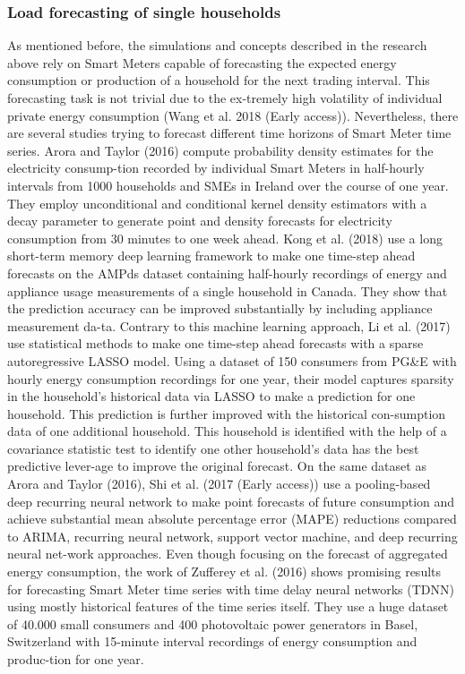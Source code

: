 \subsubsection{Load forecasting of single households}
As mentioned before, the simulations and concepts described in the research above rely on Smart Meters capable of forecasting the expected energy consumption or production of a household for the next trading interval. This forecasting task is not trivial due to the ex-tremely high volatility of individual private energy consumption (Wang et al. 2018 (Early access)). Nevertheless, there are several studies trying to forecast different time horizons of Smart Meter time series.
Arora and Taylor (2016) compute probability density estimates for the electricity consump-tion recorded by individual Smart Meters in half-hourly intervals from 1000 households and SMEs in Ireland over the course of one year. They employ unconditional and conditional kernel density estimators with a decay parameter to generate point and density forecasts for electricity consumption from 30 minutes to one week ahead.
Kong et al. (2018) use a long short-term memory deep learning framework to make one time-step ahead forecasts on the AMPds dataset containing half-hourly recordings of energy and appliance usage measurements of a single household in Canada. They show that the prediction accuracy can be improved substantially by including appliance measurement da-ta.
Contrary to this machine learning approach, Li et al. (2017) use statistical methods to make one time-step ahead forecasts with a sparse autoregressive LASSO model. Using a dataset of 150 consumers from PG\&E with hourly energy consumption recordings for one year, their model captures sparsity in the household’s historical data via LASSO to make a prediction for one household. This prediction is further improved with the historical con-sumption data of one additional household. This household is identified with the help of a covariance statistic test to identify one other household’s data has the best predictive lever-age to improve the original forecast.
On the same dataset as Arora and Taylor (2016), Shi et al. (2017 (Early access)) use a pooling-based deep recurring neural network to make point forecasts of future consumption and achieve substantial mean absolute percentage error (MAPE) reductions compared to ARIMA, recurring neural network, support vector machine, and deep recurring neural net-work approaches.
Even though focusing on the forecast of aggregated energy consumption, the work of Zufferey et al. (2016) shows promising results for forecasting Smart Meter time series with time delay neural networks (TDNN) using mostly historical features of the time series itself. They use a huge dataset of 40.000 small consumers and 400 photovoltaic power generators in Basel, Switzerland with 15-minute interval recordings of energy consumption and produc-tion for one year.
